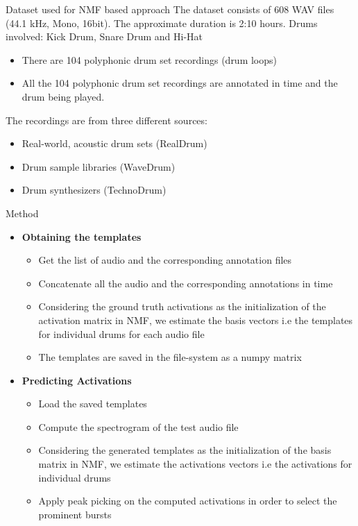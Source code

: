 \begin{frame}[t,fragile]{Dataset used for NMF based approach}
The dataset consists of 608 WAV files (44.1 kHz, Mono, 16bit). The approximate duration is 2:10 hours.
Drums involved: Kick Drum, Snare Drum and Hi-Hat
\begin{itemize}
\item There are 104 polyphonic drum set recordings (drum loops)
\item All the 104 polyphonic drum set recordings are annotated in time and the drum being played.
\end{itemize}
The recordings are from three different sources:
\begin{itemize}
\item Real-world, acoustic drum sets (RealDrum)
\item Drum sample libraries (WaveDrum)
\item Drum synthesizers (TechnoDrum)
\end{itemize}
\end{frame}

\begin{frame}[t,fragile]{Method}

\begin{itemize}
\item \textbf{Obtaining the templates}
  \begin{itemize}
  \item Get the list of audio and the corresponding annotation files
  \item Concatenate all the audio and the corresponding annotations in time
  \item Considering the ground truth activations as the initialization of the activation matrix in NMF, we estimate the basis vectors i.e the templates for individual drums for each audio file
  \item The templates are saved in the file-system as a numpy matrix
  \end{itemize}

\item \textbf{Predicting Activations}
  \begin{itemize}
    \item Load the saved templates
    \item Compute the spectrogram of the test audio file
    \item Considering the generated templates as the initialization of the basis matrix in NMF, we estimate the activations vectors i.e the activations for individual drums
    \item Apply peak picking on the computed activations in order to select the prominent bursts
  \end{itemize}

\end{itemize}
\end{frame}


